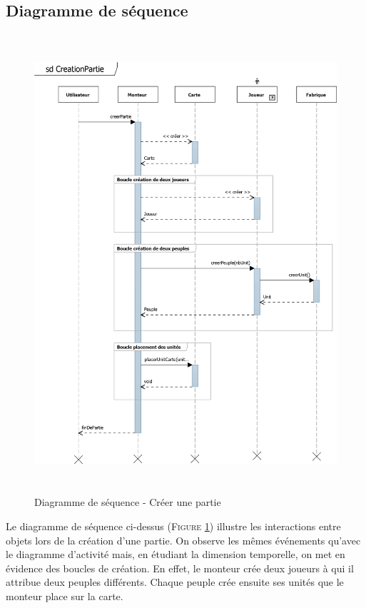 \documentclass[a4paper,11pt]{article}
\begin{document}
	\subsection{Diagramme de séquence}
		\begin{figure}[ht!]
			\includegraphics[height=17cm]{sqCreerPartie.png}
			\caption{Diagramme de séquence - Créer une partie}
			\label{fig:seqcreer}
			\end{figure}
		\vspace*{1cm}
		Le diagramme de séquence ci-dessus (\textsc{Figure \ref{fig:seqcreer}}) illustre les interactions entre objets lors de la création d'une partie. On observe les mêmes événements qu'avec le diagramme d'activité mais, en étudiant la dimension temporelle, on met en évidence des boucles de création. En effet, le monteur crée deux joueurs à qui il attribue deux peuples différents. Chaque peuple crée ensuite ses unités que le monteur place sur la carte.
		\newpage 
\end{document}
